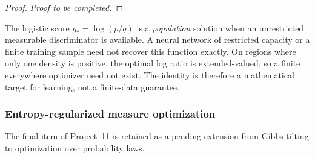 \documentclass[12pt,a4paper,oneside]{book}
\begin{document}
\begin{proof}
\noindent\textit{Proof to be completed.}
\end{proof}

\begin{Notice}
The logistic score $g_*=\log(p/q)$ is a \emph{population} solution
when an unrestricted measurable discriminator is available.
A neural network of restricted capacity or a finite training sample
need not recover this function exactly. On regions where only one
density is positive, the optimal log ratio is extended-valued,
so a finite everywhere optimizer need not exist. The identity is
therefore a mathematical target for learning, not a finite-data
guarantee.
\end{Notice}

\subsubsection{Entropy-regularized measure optimization}
The final item of Project~11 is retained as a pending extension from Gibbs tilting to optimization over probability laws.
\end{document}
